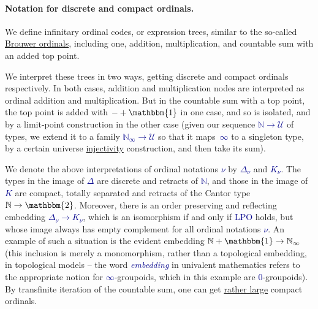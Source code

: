 \documentclass[a4paper]{easychair}
\newcommand{\db}{\textcolor{darkblue}}
\newcommand{\Kappa}{K}
\newcommand{\df}[1]{\emph{\db{#1}}}
\newcommand{\m}[1]{\db{$#1$}}
\newcommand{\N}{\mathbb{N}}
\newcommand{\NI}{\N_\infty}
\newcommand{\U}{\mathcal{U}}
\newcommand{\One}{\mathbbm{1}}
\newcommand{\Two}{\mathbbm{2}}
\begin{document}
\paragraph{Notation for discrete and compact ordinals.}
We define infinitary ordinal codes, or expression trees, similar to
the so-called
\href{http://www.cse.chalmers.se/~coquand/ordinal.ps}{Brouwer
  ordinals}, including one, addition, multiplication, and countable
sum with an added top point.

We interpret these trees in two ways, getting discrete and compact
ordinals respectively. In both cases, addition and multiplication
nodes are interpreted as ordinal addition and multiplication. But in
the countable sum with a top point, the top point is added with
\m{-+\One} in one case, and so is isolated, and by a limit-point
construction in the other case (given our sequence \m{\N \to \U} of
types, we extend it to a family \m{\NI \to \U} so that it
maps~\m{\infty} to a singleton type, by a certain universe
\href{https://en.wikipedia.org/wiki/Injective_object}{injectivity}
construction, and then take its sum).

We denote the above interpretations of ordinal notations \m{\nu} by
\m{\Delta_\nu} and \m{\Kappa_\nu}. The types in the image of
\m{\Delta} are discrete and retracts of \m{\N}, and those in the image
of \m{\Kappa} are compact, totally separated and retracts of the
Cantor type \m{\N \to \Two}.  Moreover, there is an order preserving
and reflecting embedding \m{\Delta_\nu \to \Kappa_\nu}, which is an
isomorphism if and only if \db{LPO} holds, but whose image always has
empty complement for all ordinal notations \m{\nu}. An example of such
a situation is the evident embedding \m{\N + \One \to \NI} (this
inclusion is merely a monomorphism, rather than a topological
embedding, in topological models -- the word \df{embedding} in
univalent mathematics refers to the appropriate notion for
\m{\infty}-groupoids, which in this example are \m{0}-groupoids).  By
transfinite iteration of the countable sum, one can get
\href{http://www.cs.swan.ac.uk/~csetzer/articles/weor0.pdf}{rather
  large} compact ordinals.
\end{document}
